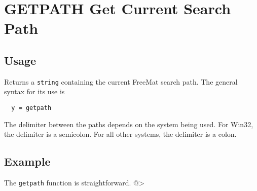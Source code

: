 \section{GETPATH Get Current Search Path}

\subsection{Usage}

Returns a \verb|string| containing the current FreeMat search path.  The general syntax for
its use is
\begin{verbatim}
  y = getpath
\end{verbatim}
The delimiter between the paths depends on the system being used.  For Win32, the
delimiter is a semicolon.  For all other systems, the delimiter is a colon.

\subsection{Example}

The \verb|getpath| function is straightforward.
@>

